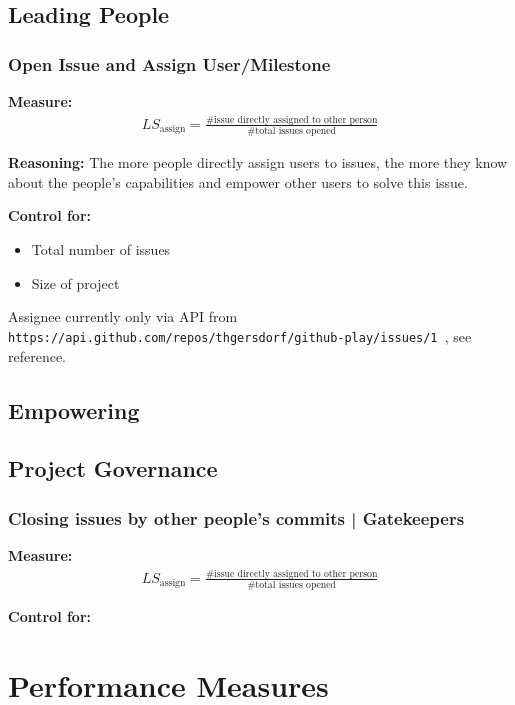 \documentclass[a4paper,10pt]{article}
\begin{document}
\subsection{Leading People}
\subsubsection{Open Issue and Assign  User/Milestone}

\textbf{Measure:}
\begin{align}
 LS_{\text{assign}} = \frac{\text{\# issue directly assigned to other person}}{\text{\# total issues opened}} 
\end{align}


\textbf{Reasoning:}
The more people directly assign users to issues, the more they know about the people's capabilities and empower other users to solve this issue.



\textbf{Control for:}
\begin{itemize}
 \item Total number of issues
\item Size of project
\end{itemize}



Assignee currently only via API from \texttt{ https://api.github.com/repos/thgersdorf/github-play/issues/1
}, see reference.



\subsection{Empowering}


\subsection{Project Governance}


\subsubsection{Closing issues by other people's commits | Gatekeepers}
\textbf{Measure:}
\begin{align}
 LS_{\text{assign}} = \frac{\text{\# issue directly assigned to other person}}{\text{\# total issues opened}} 
\end{align}

\textbf{Control for:}




\section{Performance Measures}
\end{document}
